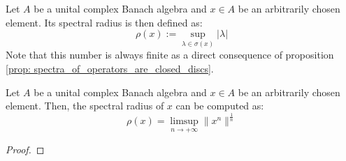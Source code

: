             \begin{definition} \label{def: spectral_radii}
                Let $A$ be a unital complex Banach algebra and $x \in A$ be an arbitrarily chosen element. Its spectral radius is then defined as:
                    $$\rho(x) := \sup_{\lambda \in \sigma(x)} |\lambda|$$
                Note that this number is always finite as a direct consequence of proposition \ref{prop: spectra_of_operators_are_closed_discs}.
            \end{definition}
            \begin{theorem} \label{theorem: gelfand_spectral_radius_formula}
                Let $A$ be a unital complex Banach algebra and $x \in A$ be an arbitrarily chosen element. Then, the spectral radius of $x$ can be computed as:
                    $$\rho(x) = \limsup_{n \to +\infty} \|x^n\|^{\frac1n}$$
            \end{theorem}
                \begin{proof}
                    
                \end{proof}
            
